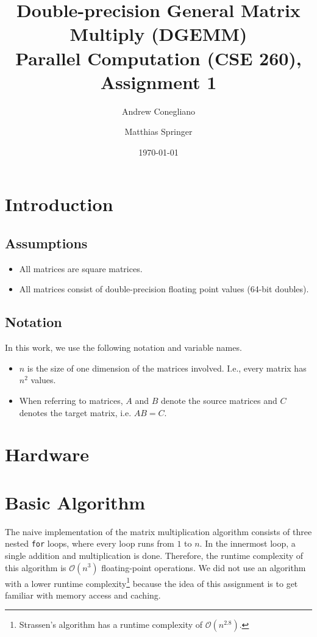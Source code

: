 \documentclass[12pt]{article}
\begin{document}
\title{Double-precision General Matrix Multiply (DGEMM)  \\ \vspace{2 mm} {\large Parallel Computation (CSE 260), Assignment 1}}
\date{\today}
\author{Andrew Conegliano \and Matthias Springer}
\maketitle

\section{Introduction}

\subsection{Assumptions}
\begin{itemize}
	\item All matrices are square matrices.
	\item All matrices consist of double-precision floating point values (64-bit doubles).
\end{itemize}

\subsection{Notation}
In this work, we use the following notation and variable names.
\begin{itemize}
	\item $n$ is the size of one dimension of the matrices involved. I.e., every matrix has $n^2$ values.
	\item When referring to matrices, $A$ and $B$ denote the source matrices and $C$ denotes the target matrix, i.e. $AB = C$.
\end{itemize}

\section{Hardware}

\section{Basic Algorithm}
The naive implementation of the matrix multiplication algorithm consists of three nested \lstinline{for} loops, where every loop runs from $1$ to $n$. In the innermost loop, a single addition and multiplication is done. Therefore, the runtime complexity of this algorithm is $\mathcal{O}(n^3)$ floating-point operations. We did not use an algorithm with a lower runtime complexity\footnote{Strassen's algorithm has a runtime complexity of $\mathcal{O}(n^{2.8})$.} because the idea of this assignment is to get familiar with memory access and caching. 
\end{document}
